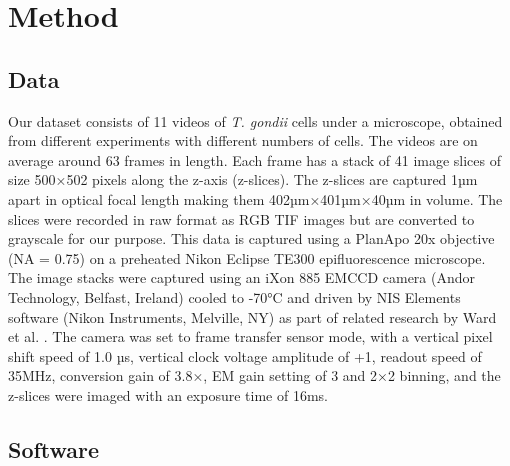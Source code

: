 \documentclass[./dissertation.tex]{subfiles}
\begin{document}
\section{Method}
\subsection{Data}
Our dataset consists of 11 videos of \textit{\textit{T. gondii}} cells under a microscope, obtained from different experiments with different numbers of cells. The videos are on average around 63 frames in length. Each frame has a stack of 41 image slices of size 500×502 pixels along the z-axis (z-slices). The z-slices are captured 1µm apart in optical focal length making them 402µm×401µm×40µm in volume. The slices were recorded in raw format as RGB TIF images but are converted to grayscale for our purpose. This data is captured using a PlanApo 20x objective (NA = 0.75) on a preheated Nikon Eclipse TE300 epifluorescence microscope. The image stacks were captured using an iXon 885 EMCCD camera (Andor Technology, Belfast, Ireland) cooled to -70°C and driven by NIS Elements software (Nikon Instruments, Melville, NY) as part of related research by Ward et al. \cite{TgPHIL1}. The camera was set to frame transfer sensor mode, with a vertical pixel shift speed of 1.0 µs, vertical clock voltage amplitude of +1, readout speed of 35MHz, conversion gain of 3.8×, EM gain setting of 3 and 2×2 binning, and the z-slices were imaged with an exposure time of 16ms.

\subsection{Software}
\end{document}
